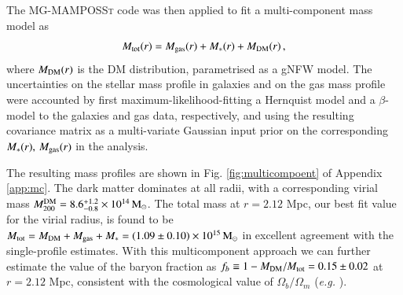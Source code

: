 \documentclass{aa}
\begin{document}
The \textsc{MG-MAMPOSSt} code was then applied to fit a multi-component mass model as
\begin{equation}\label{eq:multic}
    M_\text{\rm tot}(r) = M_\text{\rm gas}(r) + M_{*}(r) + M_\text{\rm DM}(r)\,,
\end{equation}
where $M_\text{\rm DM}(r)$ is the DM distribution, parametrised as a gNFW model. The uncertainties on the stellar mass profile in galaxies and on the gas mass profile were accounted by first maximum-likelihood-fitting a Hernquist model and a $\beta$-model to the galaxies and gas data, respectively, and using the resulting covariance matrix as a multi-variate Gaussian input prior on the corresponding $M_{*}(r),\,M_\text{\rm gas}(r)$ in the  analysis.

The resulting mass profiles are shown in Fig. \ref{fig:multicompoent} of Appendix \ref{app:mc}. The dark matter dominates at all radii, with a corresponding virial mass $M_{200}^{\rm DM} = 8.6^{+1.2}_{-0.8} \times 10^{14} \, \text{M}_\odot$. The total mass at $r= 2.12$ Mpc, our best fit value for the virial radius, is found to be $M_{\rm tot} = M_{\rm DM}+M_{\rm gas}+M_{*} = (1.09\pm{0.10})\times 10^{15} \,\text{M}_\odot$ in excellent agreement with the single-profile estimates. With this multicomponent approach we can further estimate the value of the baryon fraction as  $f_b \equiv 1- M_{\rm DM}/M_{\rm tot} =  0.15 \pm 0.02$ at $r = 2.12$ Mpc, consistent with the cosmological value of $\Omega_b/\Omega_m$ (\textit{e.g.} \citealt{Krolewski2025}).
\end{document}
